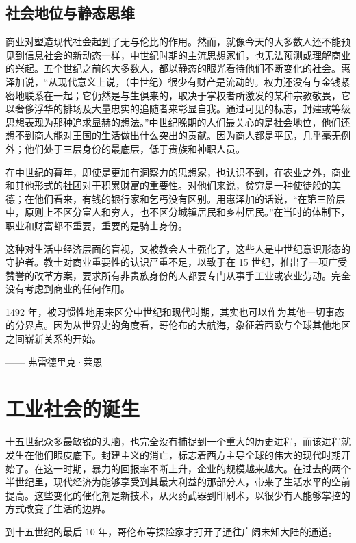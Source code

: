 \subsection{社会地位与静态思维}
商业对塑造现代社会起到了无与伦比的作用。然而，就像今天的大多数人还不能预见到信息社会的新动态一样，中世纪时期的主流思想家们，也无法预测或理解商业的兴起。五个世纪之前的大多数人，都以静态的眼光看待他们不断变化的社会。惠泽加说，“从现代意义上说，（中世纪）很少有财产是流动的。权力还没有与金钱紧密地联系在一起；它仍然是与生俱来的，取决于掌权者所激发的某种宗教敬畏，它以奢侈浮华的排场及大量忠实的追随者来彰显自我。通过可见的标志，封建或等级思想表现为那种追求显赫的想法。”中世纪晚期的人们最关心的是社会地位，他们还想不到商人能对王国的生活做出什么突出的贡献。因为商人都是平民，几乎毫无例外；他们处于三层身份的最底层，低于贵族和神职人员。

在中世纪的暮年，即使是更加有洞察力的思想家，也认识不到，在农业之外，商业和其他形式的社团对于积累财富的重要性。对他们来说，贫穷是一种使徒般的美德；在他们看来，有钱的银行家和乞丐没有区别。用惠泽加的话说，“在第三阶层中，原则上不区分富人和穷人，也不区分城镇居民和乡村居民。”在当时的体制下，职业和财富都不重要，重要的是骑士身份。

这种对生活中经济层面的盲视，又被教会人士强化了，这些人是中世纪意识形态的守护者。教士对商业重要性的认识严重不足，以致于在 15 世纪，推出了一项广受赞誉的改革方案，要求所有非贵族身份的人都要专门从事手工业或农业劳动。完全没有考虑到商业的任何作用。


\begin{tcolorbox}
1492 年，被习惯性地用来区分中世纪和现代时期，其实也可以作为其他一切事态的分界点。因为从世界史的角度看，哥伦布的大航海，象征着西欧与全球其他地区之间崭新关系的开始。
\begin{flushright}
—— 弗雷德里克·莱恩
\end{flushright}
\end{tcolorbox}


\section{工业社会的诞生}
十五世纪众多最敏锐的头脑，也完全没有捕捉到一个重大的历史进程，而该进程就发生在他们眼皮底下。封建主义的消亡，标志着西方主导全球的伟大的现代时期开始了。在这一时期，暴力的回报率不断上升，企业的规模越来越大。在过去的两个半世纪里，现代经济为能够享受到其最大利益的那部分人，带来了生活水平的空前提高。这些变化的催化剂是新技术，从火药武器到印刷术，以很少有人能够掌控的方式改变了生活的边界。

到十五世纪的最后 10 年，哥伦布等探险家才打开了通往广阔未知大陆的通道。

